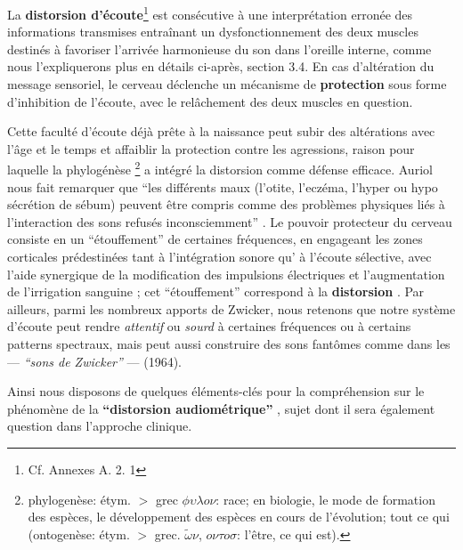 La \textbf{distorsion d'écoute}\footnote{Cf. Annexes A. 2. 1}
 est consécutive à une interprétation
erronée des informations transmises entraînant un dysfonctionnement
des deux muscles destinés à favoriser l'arrivée
harmonieuse du son dans l'oreille interne, comme nous l'expliquerons plus en détails ci-après, section 
3.4.
En cas d'altération du message sensoriel,
le cerveau déclenche un mécanisme de\textbf{ protection} sous forme
d'inhibition de l'écoute, avec le relâchement des deux muscles en
question. 

Cette faculté d'écoute déjà prête à la naissance peut subir des
altérations avec l'âge et
le temps et affaiblir la protection contre les agressions, raison pour
laquelle la phylogénèse \footnote{ phylogenèse: étym. $>$ grec $\phi
  \upsilon \lambda o \nu $: race; en biologie, le mode de formation des espèces, le développement
  des espèces en cours de l'évolution; tout ce qui (ontogenèse:
  étym. $>$ grec. $\tilde{\omega}\nu$, $o \nu \tau o
  \sigma$: l'être,
ce qui est).}  a intégré la distorsion comme défense
efficace.
Auriol nous fait
remarquer que
\enquote {les différents maux (l'otite, l'eczéma, l'hyper
ou hypo sécrétion de sébum) peuvent être compris comme des problèmes physiques liés à l'interaction des sons refusés
inconsciemment} \autocite [19--20] {auriol:cle}.
Le pouvoir protecteur du cerveau consiste en un  ``étouffement'' de
certaines fréquences,  en engageant les zones corticales prédestinées
tant à
l'intégration sonore qu' à l'écoute sélective,  avec l'aide synergique de la
modification des impulsions électriques et l'augmentation de
l'irrigation sanguine \autocite [14] {auriol:cle};
cet ``étouffement'' correspond à la \textbf{distorsion}
\autocite{tomatis:education}.
Par ailleurs,  parmi les nombreux apports de Zwicker, \autocite[p 84]{auriol:cle} nous retenons que notre 
système d'écoute peut rendre
\textit{attentif} ou\textit{ sourd} à certaines fréquences ou à certains patterns
spectraux, mais peut aussi construire des sons fantômes comme dans les --- \textit{``sons de 
Zwicker''} --- (1964).


Ainsi nous disposons de quelques éléments-clés pour la compréhension
sur le phénomène de la \textbf{``distorsion audiométrique''} \autocite
{auriol:cle}, sujet dont il sera également question dans l'approche
clinique.




